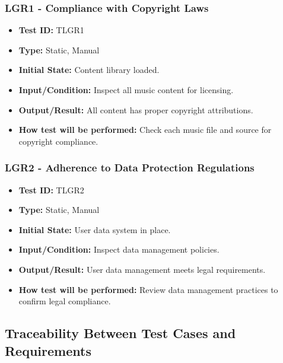 \documentclass[12pt, titlepage]{article}
\begin{document}
\subsubsection{LGR1 - Compliance with Copyright Laws}
\begin{itemize}
    \item \textbf{Test ID:} TLGR1
    \item \textbf{Type:} Static, Manual
    \item \textbf{Initial State:} Content library loaded.
    \item \textbf{Input/Condition:} Inspect all music content for licensing.
    \item \textbf{Output/Result:} All content has proper copyright attributions.
    \item \textbf{How test will be performed:} Check each music file and source for copyright compliance.
\end{itemize}

\subsubsection{LGR2 - Adherence to Data Protection Regulations}
\begin{itemize}
    \item \textbf{Test ID:} TLGR2
    \item \textbf{Type:} Static, Manual
    \item \textbf{Initial State:} User data system in place.
    \item \textbf{Input/Condition:} Inspect data management policies.
    \item \textbf{Output/Result:} User data management meets legal requirements.
    \item \textbf{How test will be performed:} Review data management practices to confirm legal compliance.
\end{itemize}

\subsection{Traceability Between Test Cases and Requirements}
\end{document}
